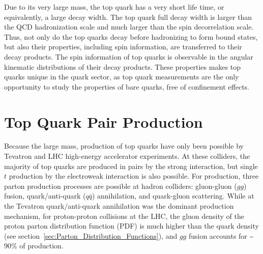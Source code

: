 Due to its very large mass, the top quark has a very short life time, or equivalently, a large decay width.
The top quark full decay width is larger than the QCD hadronization scale and much larger than the spin decorrelation scale.
Thus, not only do the top quarks decay before hadronizing to form bound states, but also their properties, including spin information, are transferred to their decay products.
The spin information of top quarks is observable in the angular kinematic distributions of their decay products.
These properties makes top quarks unique in the quark sector, as top quark measurements are the only opportunity to study the properties of bare quarks, free of confinement effects.

\section{Top Quark Pair Production}
\label{Top_Quark_Pair_Production}
Because the large mass, production of top quarks have only been possible by Tevatron and LHC high-energy accelerator experiments.
At these colliders, the majority of top quarks are produced in \ttbar pairs by the strong interaction, but single $t$ production by the electroweak interaction is also possible.
For \ttbar production, three parton production processes are possible at hadron colliders: gluon-gluon ($gg$) fusion, quark/anti-quark ($q\bar{q}$) annihilation, and quark-gluon scattering.
While at the Tevatron quark$\slash$anti-quark annihilation was the dominant production mechanism, for \beamenergy proton-proton collisions at the LHC, the gluon density of the proton parton distribution function (PDF) is much higher than the quark density (see section~\ref{sec:Parton_Distribution_Functions}), and $gg$ fusion accounts for \sim$90 \%$ of \ttbar production.

